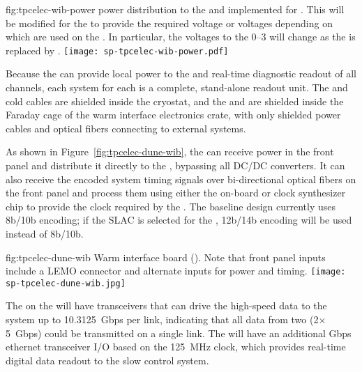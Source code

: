 \begin{dunefigure}
{fig:tpcelec-wib-power}
{ power distribution to the  and  implemented for . This will be modified for the  to provide the required voltage or voltages depending on which  are used on the . In particular, the voltages to the  \numrange{0}{3} will change as the   is replaced by . }
\texttt{[image: sp-tpcelec-wib-power.pdf]}
\end{dunefigure}

Because the  can provide local power to the  and real-time diagnostic readout of all channels,
each  system for each  is a complete, stand-alone readout unit. The  and cold cables are shielded
inside the cryostat, and the  and  are shielded inside the Faraday cage of the warm interface
electronics crate, with only shielded power cables and optical fibers connecting to external systems.

As shown in Figure~\ref{fig:tpcelec-dune-wib}, the  can receive  power in the front panel and distribute it directly to the , bypassing all DC/DC converters.
It can also receive the encoded system timing signals over bi-directional optical
fibers on the front panel and process them using either
the on-board  or clock synthesizer chip to provide the clock required by the .
The baseline  design currently uses 8b/10b encoding; if the SLAC   is selected for
the  , 12b/14b encoding will be used instead of 8b/10b.

\begin{dunefigure}
{fig:tpcelec-dune-wib}
{Warm interface board (). Note that front panel inputs include a LEMO connector and alternate inputs for  power and timing.}
\texttt{[image: sp-tpcelec-dune-wib.jpg]}
\end{dunefigure}

The  on the  will have
transceivers that can drive the high-speed data to the  system up to
10.3125~Gbps per link, indicating that all data from
two  (2$\times$5~Gbps) could be transmitted on a single link.
The  will have an additional Gbps ethernet transceiver I/O based on the \SI{125}{MHz} clock, which 
provides real-time digital data readout to the slow control system.

